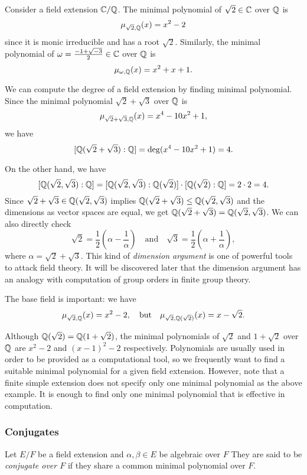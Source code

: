 \documentclass{../exp}
\begin{document}
\begin{exs}
\item
Consider a field extension $\mathbb{C}/\mathbb{Q}$.
The minimal polynomial of $\sqrt2\in\mathbb{C}$ over $\mathbb{Q}$ is
\[\mu_{\sqrt2,\mathbb{Q}}(x)=x^2-2\]
since it is monic irreducible and has a root $\sqrt2$.
Similarly, the minimal polynomial of $\omega=\frac{-1+\sqrt{-3}}2\in\mathbb{C}$ over $\mathbb{Q}$ is
\[\mu_{\omega,\mathbb{Q}}(x)=x^2+x+1.\]

\item
We can compute the degree of a field extension by finding minimal polynomial.
Since the minimal polynomial $\sqrt2+\sqrt3$ over $\mathbb{Q}$ is
\[\mu_{\sqrt2+\sqrt3,\mathbb{Q}}(x)=x^4-10x^2+1,\]
we have
\[[\mathbb{Q}(\sqrt2+\sqrt3):\mathbb{Q}]=\deg(x^4-10x^2+1)=4.\]

On the other hand, we have
\[[\mathbb{Q}(\sqrt2,\sqrt3):\mathbb{Q}]=[\mathbb{Q}(\sqrt2,\sqrt3):\mathbb{Q}(\sqrt2)]\cdot[\mathbb{Q}(\sqrt2):\mathbb{Q}]=2\cdot2=4.\]
Since $\sqrt2+\sqrt3\in\mathbb{Q}(\sqrt2,\sqrt3)$ implies $\mathbb{Q}(\sqrt2+\sqrt3)\le\mathbb{Q}(\sqrt2,\sqrt3)$ and the dimensions as vector spaces are equal, we get $\mathbb{Q}(\sqrt2+\sqrt3)=\mathbb{Q}(\sqrt2,\sqrt3)$.
We can also directly check
\[\sqrt2=\frac12\left(\alpha-\frac1\alpha\right)\quad\text{and}\quad\sqrt3=\frac12\left(\alpha+\frac1\alpha\right),\]
where $\alpha=\sqrt2+\sqrt3$.
This kind of \emph{dimension argument} is one of powerful tools to attack field theory.
It will be discovered later that the dimension argument has an analogy with computation of group orders in finite group theory.

\item
The base field is important: we have
\[\mu_{\sqrt2,\mathbb{Q}}(x)=x^2-2,\quad\text{but}\quad\mu_{\sqrt2,\mathbb{Q}(\sqrt2)}(x)=x-\sqrt2.\]

\item
Although $\mathbb{Q}(\sqrt2)=\mathbb{Q}(1+\sqrt2)$, the minimal polynomials of $\sqrt2$ and $1+\sqrt2$ over $\mathbb{Q}$ are $x^2-2$ and $(x-1)^2-2$ respectively.
Polynomials are usually used in order to be provided as a computational tool, so we frequently want to find a suitable minimal polynomial for a given field extension.
However, note that a finite simple extension does not specify only one minimal polynomial as the above example.
It is enough to find only one minimal polynomial that is effective in computation.
\end{exs}

\subsubsection{Conjugates}

\begin{defn}
Let $E/F$ be a field extension and $\alpha,\beta\in E$ be algebraic over $F$
They are said to be \emph{conjugate over $F$} if they share a common minimal polynomial over $F$.
\end{defn}
\end{document}
